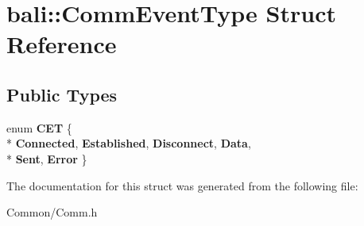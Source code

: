 \hypertarget{structbali_1_1_comm_event_type}{\section{bali\-:\-:Comm\-Event\-Type Struct Reference}
\label{structbali_1_1_comm_event_type}
}
\subsection*{Public Types}
\begin{DoxyCompactItemize}
\item 
enum {\bfseries C\-E\-T} \{ \\*
{\bfseries Connected}, 
{\bfseries Established}, 
{\bfseries Disconnect}, 
{\bfseries Data}, 
\\*
{\bfseries Sent}, 
{\bfseries Error}
 \}
\end{DoxyCompactItemize}


The documentation for this struct was generated from the following file\-:\begin{DoxyCompactItemize}
\item 
Common/Comm.\-h\end{DoxyCompactItemize}
